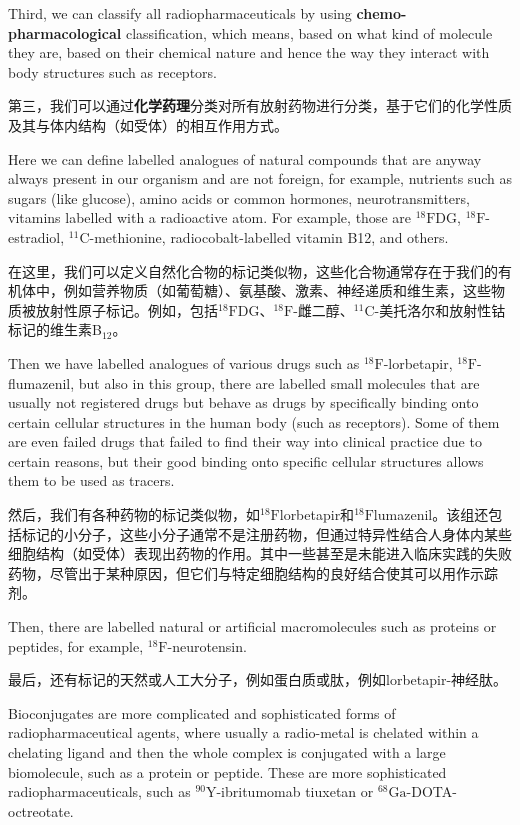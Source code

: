 \documentclass[dvipsnames, svgnames,a4paper,11pt]{article}
\begin{document}
Third, we can classify all radiopharmaceuticals by using \textbf{chemo-pharmacological} classification, which means, based on what kind of molecule they are, based on their chemical nature and hence the way they interact with body structures such as receptors.  

第三，我们可以通过\textbf{化学药理}分类对所有放射药物进行分类，基于它们的化学性质及其与体内结构（如受体）的相互作用方式。

Here we can define labelled analogues of natural compounds that are anyway always present in our organism and are not foreign, for example, nutrients such as sugars (like glucose), amino acids or common hormones, neurotransmitters, vitamins labelled with a radioactive atom. For example, those are \(\mathrm{^{18}FDG}\), \(\mathrm{^{18}F}\)-estradiol, \(\mathrm{^{11}C}\)-methionine, radiocobalt-labelled vitamin B12, and others.  

在这里，我们可以定义自然化合物的标记类似物，这些化合物通常存在于我们的有机体中，例如营养物质（如葡萄糖）、氨基酸、激素、神经递质和维生素，这些物质被放射性原子标记。例如，包括${}^\text{18}\text{F}$DG、${}^\text{18}\text{F}$-雌二醇、${}^\text{11}\text{C}$-美托洛尔和放射性钴标记的维生素B${}_{12}$。


Then we have labelled analogues of various drugs such as \(\mathrm{^{18}F}\)-lorbetapir, \(\mathrm{^{18}F}\)-flumazenil, but also in this group, there are labelled small molecules that are usually not registered drugs but behave as drugs by specifically binding onto certain cellular structures in the human body (such as receptors). Some of them are even failed drugs that failed to find their way into clinical practice due to certain reasons, but their good binding onto specific cellular structures allows them to be used as tracers.  

然后，我们有各种药物的标记类似物，如${}^\text{18}\text{F}$lorbetapir和${}^\text{18}\text{F}$lumazenil。该组还包括标记的小分子，这些小分子通常不是注册药物，但通过特异性结合人身体内某些细胞结构（如受体）表现出药物的作用。其中一些甚至是未能进入临床实践的失败药物，尽管出于某种原因，但它们与特定细胞结构的良好结合使其可以用作示踪剂。

Then, there are labelled natural or artificial macromolecules such as proteins or peptides, for example, \(\mathrm{^{18}F}\)-neurotensin.

最后，还有标记的天然或人工大分子，例如蛋白质或肽，例如lorbetapir-神经肽。

Bioconjugates are more complicated and sophisticated forms of radiopharmaceutical agents, where usually a radio-metal is chelated within a chelating ligand and then the whole complex is conjugated with a large biomolecule, such as a protein or peptide. These are more sophisticated radiopharmaceuticals, such as \(\mathrm{^{90}Y}\)-ibritumomab tiuxetan or \(\mathrm{^{68}Ga}\)-DOTA-octreotate.  
\end{document}
